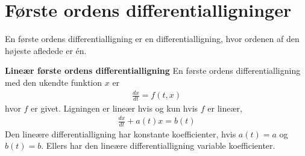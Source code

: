 \section{Første ordens differentialligninger}

En første ordens differentialligning er en differentialligning, hvor ordenen af den højeste afledede er én. 

\begin{defn} \textbf{Lineær første ordens differentialligning} %
\newline
En første ordens differentialligning med den ukendte funktion $x$ er 
\begin{align}
    \frac{dx}{dt}=f(t,x)  
\end{align}
hvor $f$ er givet. Ligningen er lineær hvis og kun hvis $f$ er lineær,
\begin{align}
    \frac{dx}{dt}+a(t)x=b(t)
\end{align}
Den lineære differentialligning har konstante koefficienter, hvis $a(t)=a$ og $b(t)=b$. Ellers har den lineære differentialligning variable koefficienter.
\end{defn}






